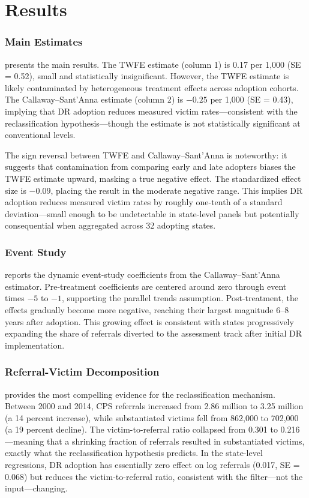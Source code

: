 \documentclass[12pt]{article}
\begin{document}
\section{Results}

\subsubsection*{Main Estimates}  presents the main results. The TWFE estimate (column 1) is 0.17 per 1,000 (SE = 0.52), small and statistically insignificant. However, the TWFE estimate is likely contaminated by heterogeneous treatment effects across adoption cohorts. The Callaway--Sant'Anna estimate (column 2) is $-0.25$ per 1,000 (SE = 0.43), implying that DR adoption reduces measured victim rates---consistent with the reclassification hypothesis---though the estimate is not statistically significant at conventional levels.

The sign reversal between TWFE and Callaway--Sant'Anna is noteworthy: it suggests that contamination from comparing early and late adopters biases the TWFE estimate upward, masking a true negative effect. The standardized effect size is $-0.09$, placing the result in the moderate negative range. This implies DR adoption reduces measured victim rates by roughly one-tenth of a standard deviation---small enough to be undetectable in state-level panels but potentially consequential when aggregated across 32 adopting states.

\subsubsection*{Event Study}  reports the dynamic event-study coefficients from the Callaway--Sant'Anna estimator. Pre-treatment coefficients are centered around zero through event times $-5$ to $-1$, supporting the parallel trends assumption. Post-treatment, the effects gradually become more negative, reaching their largest magnitude 6--8 years after adoption. This growing effect is consistent with states progressively expanding the share of referrals diverted to the assessment track after initial DR implementation.

\subsubsection*{Referral-Victim Decomposition}  provides the most compelling evidence for the reclassification mechanism. Between 2000 and 2014, CPS referrals increased from 2.86 million to 3.25 million (a 14 percent increase), while substantiated victims fell from 862,000 to 702,000 (a 19 percent decline). The victim-to-referral ratio collapsed from 0.301 to 0.216---meaning that a shrinking fraction of referrals resulted in substantiated victims, exactly what the reclassification hypothesis predicts. In the state-level regressions, DR adoption has essentially zero effect on log referrals (0.017, SE = 0.068) but reduces the victim-to-referral ratio, consistent with the filter---not the input---changing.
\end{document}
